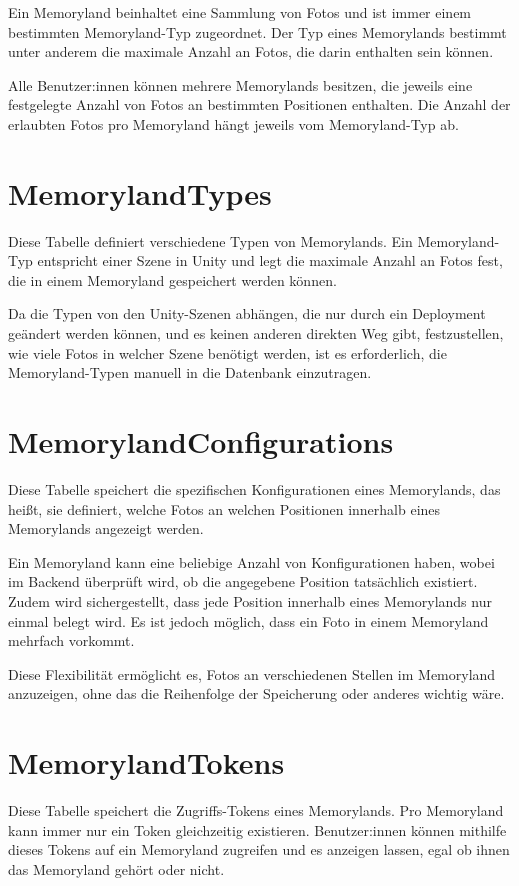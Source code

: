 Ein Memoryland beinhaltet eine Sammlung von Fotos und ist immer einem bestimmten 
Memoryland-Typ zugeordnet. Der Typ eines Memorylands bestimmt unter anderem die maximale 
Anzahl an Fotos, die darin enthalten sein können.

Alle Benutzer:innen können mehrere Memorylands besitzen, die jeweils eine festgelegte Anzahl 
von Fotos an bestimmten Positionen enthalten. Die Anzahl der erlaubten Fotos pro Memoryland
hängt jeweils vom Memoryland-Typ ab.

\section{MemorylandTypes}

Diese Tabelle definiert verschiedene Typen von Memorylands. Ein Memoryland-Typ 
entspricht einer Szene in Unity und legt die maximale Anzahl an Fotos fest, die in 
einem Memoryland gespeichert werden können.

Da die Typen von den Unity-Szenen abhängen, die nur durch ein Deployment geändert werden 
können, und es keinen anderen direkten Weg gibt, festzustellen, wie viele Fotos in welcher 
Szene benötigt werden, ist es erforderlich, die Memoryland-Typen manuell in die Datenbank 
einzutragen.

\section{MemorylandConfigurations}

Diese Tabelle speichert die spezifischen Konfigurationen eines Memorylands, das heißt, 
sie definiert, welche Fotos an welchen Positionen innerhalb eines Memorylands angezeigt werden. 

Ein Memoryland kann eine beliebige Anzahl von Konfigurationen haben, wobei im Backend überprüft 
wird, ob die angegebene Position tatsächlich existiert. Zudem wird sichergestellt, dass jede 
Position innerhalb eines Memorylands nur einmal belegt wird. Es ist jedoch möglich, dass ein 
Foto in einem Memoryland mehrfach vorkommt. 

Diese Flexibilität ermöglicht es, Fotos an verschiedenen Stellen im Memoryland anzuzeigen,
ohne das die Reihenfolge der Speicherung oder anderes wichtig wäre.

\section{MemorylandTokens}

Diese Tabelle speichert die Zugriffs-Tokens eines Memorylands. Pro Memoryland kann immer nur 
ein Token gleichzeitig existieren. Benutzer:innen können mithilfe dieses Tokens auf ein 
Memoryland zugreifen und es anzeigen lassen, egal ob ihnen das Memoryland gehört oder nicht.

